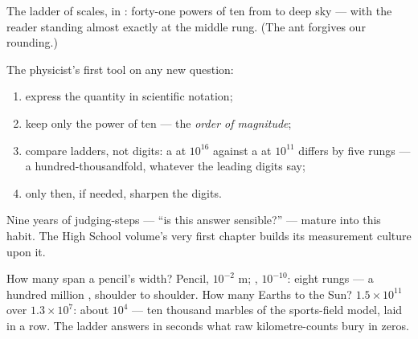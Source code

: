 \begin{omfigure}

{\small The ladder of scales, in : forty-one powers of
ten from  to deep sky --- with the reader standing
almost exactly at the middle rung. (The ant forgives our
rounding.)}
\end{omfigure}

\begin{method}\label{met:g9:atoms-to-galaxies:oom}
The physicist's first tool on any new question:
\begin{enumerate}
  \item express the quantity in scientific notation;
  \item keep only the power of ten --- the \emph{order of
        magnitude};
  \item compare ladders, not digits: a  at $10^{16}$
         against a  at $10^{11}$ differs by five
        rungs --- a hundred-thousandfold, whatever the
        leading digits say;
  \item only then, if needed, sharpen the digits.
\end{enumerate}
Nine years of judging-steps --- ``is this answer sensible?''
--- mature into this habit. The High School volume's very
first chapter builds its measurement culture upon it.
\end{method}

\begin{example}\label{ex:g9:atoms-to-galaxies:arithmetic}
How many  span a pencil's width? Pencil, $10^{-2}$
\unit{m}; , $10^{-10}$: eight rungs --- a hundred
million , shoulder to shoulder. How many Earths to the
Sun? $1.5 \times 10^{11}$ over $1.3 \times 10^{7}$: about
$10^{4}$ --- ten thousand marbles of the sports-field model,
laid in a row. The ladder answers in seconds what raw
kilometre-counts bury in zeros.
\end{example}

